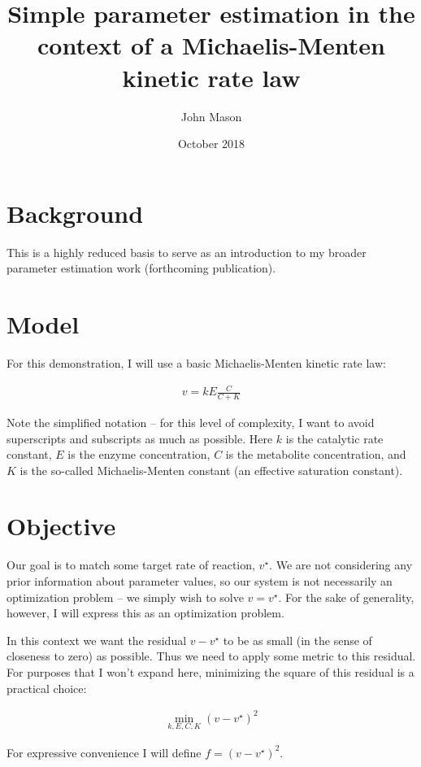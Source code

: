 \documentclass{article}
\title{Simple parameter estimation in the context of a Michaelis-Menten kinetic rate law}
\author{John Mason}
\date{October 2018}
\begin{document}
\maketitle

\section{Background}

This is a highly reduced basis to serve as an introduction to my broader parameter estimation work (forthcoming publication).

\section{Model}

For this demonstration, I will use a basic Michaelis-Menten kinetic rate law:

\begin{align}
v = k E \frac{C}{C + K} \label{equation:MM}
\end{align}

Note the simplified notation -- for this level of complexity, I want to avoid superscripts and subscripts as much as possible.  Here \(k\) is the catalytic rate constant, \(E\) is the enzyme concentration, \(C\) is the metabolite concentration, and \(K\) is the so-called Michaelis-Menten constant (an effective saturation constant).

\section{Objective}

Our goal is to match some target rate of reaction, \(v^\star\).  We are not considering any prior information about parameter values, so our system is not necessarily an optimization problem -- we simply wish to solve \(v = v^\star\).  For the sake of generality, however, I will express this as an optimization problem.

In this context we want the residual \(v - v^\star\) to be as small (in the sense of closeness to zero) as possible.  Thus we need to apply some metric to this residual.  For purposes that I won't expand here, minimizing the square of this residual is a practical choice:

\begin{align}
\min_{k, E, C, K} \left(v - v^\star\right)^2
\end{align}

For expressive convenience I will define \(f = \left(v - v^\star\right)^2\).
\end{document}
